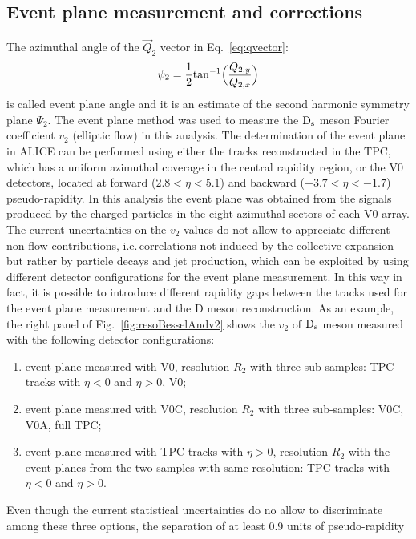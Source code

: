 \subsection{Event plane measurement and corrections}
\label{sec:EPmeasurement}
The azimuthal angle of the $\vec{Q}_2$ vector in Eq.~\ref{eq:qvector}:
\begin{equation}
\label{eq:psi2}
\psi_2= \frac{1}{2} {\rm tan}^{-1} \Big (\frac{Q_{2,y}}{Q_{2,x}} \Big )
\end{equation}
is called event plane angle and it is an estimate of the second harmonic symmetry plane $\Psi_2$.
The event plane method was used to measure the ${\rm D_s}$ meson 
Fourier coefficient $v_2$ (elliptic flow) in this analysis.
The determination of the event plane in ALICE can be performed using
either the tracks reconstructed in the TPC, which has a uniform
azimuthal coverage in the central rapidity region, or the V0
detectors, located at forward ($2.8<\eta<5.1$) and backward
($-3.7<\eta<-1.7$) pseudo-rapidity.
In this analysis the event plane was obtained from the 
signals produced by the charged particles in the eight 
azimuthal sectors of each V0 array. 
The current uncertainties on the $v_2$ values do not allow to
appreciate different non-flow contributions, i.e.\,correlations not 
induced by the collective expansion but rather by particle decays and 
jet production, which can be exploited by using different detector configurations
for the event plane measurement. In this way in fact, it is possible to introduce different
rapidity gaps between the tracks used for the event plane measurement
and the D meson reconstruction. As an example, the right panel of Fig.~\ref{fig:resoBesselAndv2}
shows the $v_2$ of ${\rm D_s}$ meson measured with the following detector configurations:
\begin{enumerate}
\item event plane measured with V0,  
resolution $R_2$ with three sub-samples: TPC tracks with $\eta < 0$ and $\eta > 0$, V0; 
\item event plane measured with V0C,  
resolution $R_2$ with three sub-samples: V0C, V0A, full TPC; 
\item event plane measured with TPC tracks with $\eta > 0$,  
resolution $R_2$ with the event planes from the two samples with same resolution: 
TPC tracks with $\eta < 0$ and $\eta > 0$.
\end{enumerate}
Even though the current statistical uncertainties do no allow to discriminate among these three options,
the separation of at least 0.9 units of pseudo-rapidity 
